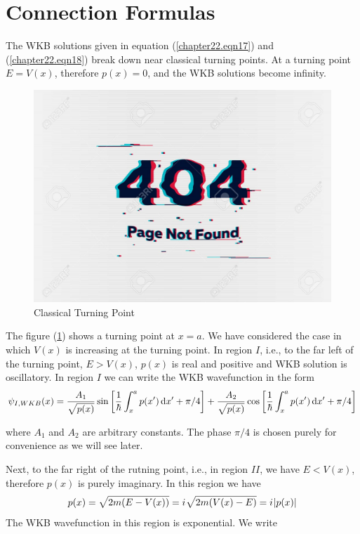 \section{Connection Formulas}

The WKB solutions given in equation (\ref{chapter22.eqn17}) and (\ref{chapter22.eqn18}) break down near classical turning points. At a turning point $E=V(x)$, therefore $p(x)=0$, and the WKB solutions become infinity.

\begin{figure}
	\centering
	\includegraphics[width=0.5\linewidth]{Pictures/not-found.jpg}
	\caption{Classical Turning Point}
	\label{chapter22.fig1}
\end{figure}

The figure (\ref{chapter22.fig1}) shows a turning point at $x=a$. We have considered the case in which $V(x)$ is increasing at the turning point. In region $I$, i.e., to the far left of the turning point, $E > V(x)$, $p(x)$ is real and positive and WKB solution is oscillatory. In region $I$ we can write the WKB wavefunction in the form
\begin{equation}
	\label{chapter22.eqn26}
	\psi_{I,WKB}(x) = \frac{A_1}{\sqrt{p(x)}} \sin \qty[\frac{1}{\hbar} \int_{x}^{a} p(x^\prime) \dd{x^\prime} + \pi/4]  +  \frac{A_2}{\sqrt{p(x)}} \cos \qty[\frac{1}{\hbar} \int_{x}^{a} p(x^\prime) \dd{x^\prime} + \pi/4]
\end{equation}

where $A_1$ and $A_2$ are arbitrary constants. The phase $\pi/4$ is chosen purely for convenience as we will see later.

Next, to the far right of the rutning point, i.e., in region $II$, we have $E<V(x)$, therefore $p(x)$ is purely imaginary. In this region we have
\begin{equation}
p(x) = \sqrt{2 m \qty(E - V(x))} = {i\mkern1mu} \sqrt{2 m \qty(V(x) - E)} = {i\mkern1mu} \abs{p(x)}
\end{equation}
The WKB wavefunction in this region is exponential. We write

